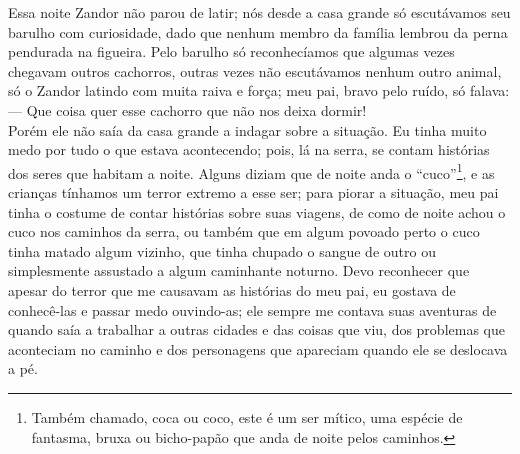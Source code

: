 Essa noite Zandor não parou de latir; nós desde a casa grande só escutávamos seu barulho com curiosidade, dado que nenhum membro da família lembrou da perna pendurada na figueira. Pelo barulho só reconhecíamos que algumas vezes chegavam outros cachorros, outras vezes não escutávamos nenhum outro animal, só o Zandor latindo com muita raiva e força; meu pai, bravo pelo ruído, só falava:\\\indent
--- Que coisa quer esse cachorro que não nos deixa dormir!\\\indent
Porém ele não saía da casa grande a indagar sobre a situação. Eu tinha muito medo por tudo o que estava acontecendo; pois, lá na serra, se contam histórias dos seres que habitam a noite. 
Alguns diziam que de noite anda o ``cuco''\footnote{Também chamado, coca ou coco, este é um ser mítico, uma espécie de fantasma, bruxa ou bicho-papão que anda de noite pelos caminhos.}, e as crianças tínhamos um terror extremo a esse ser; para piorar a situação, meu pai tinha o costume de contar histórias sobre suas viagens, de como de noite achou o cuco nos caminhos da serra, ou também que em algum povoado perto o cuco tinha matado algum vizinho, que tinha chupado o sangue de outro ou simplesmente assustado a algum caminhante noturno. Devo reconhecer que apesar do terror que me causavam as histórias do meu pai, eu gostava de conhecê-las e passar medo ouvindo-as; ele sempre me contava suas aventuras de quando saía a trabalhar a outras cidades e das coisas que viu, dos problemas que aconteciam no caminho e dos personagens que apareciam quando ele se deslocava a pé.

